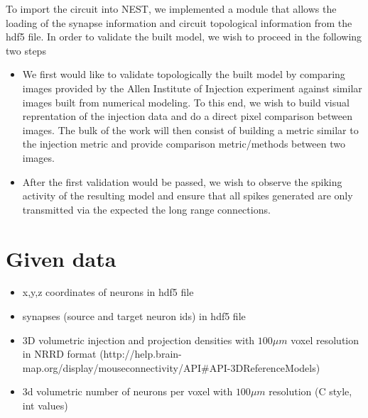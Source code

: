 \documentclass[a4paper]{IEEEtran}
\begin{document}
   
   To import the circuit into NEST, we implemented a module that allows the loading of the synapse information and circuit topological information from the hdf5 file.
   In order to validate the built model, we wish to proceed in the following two steps
\begin{itemize} 
\item We first would like to validate topologically the built model by comparing images provided by the Allen Institute of Injection experiment against 
similar images built from numerical modeling. To this end, we wish to build visual reprentation of the injection data and do a direct pixel comparison between images. The bulk of the work will then consist of building a metric similar to the injection metric and provide comparison metric/methods between two images.
\item After the first validation would be passed, we wish to observe the spiking activity of the resulting model and ensure that all spikes generated are only transmitted via the expected the long range connections. 
\end{itemize}
   
   \section{Given data}
   \begin{itemize}
      \item x,y,z coordinates of neurons in hdf5 file
      \item synapses (source and target neuron ids) in hdf5 file
	  \item 3D volumetric injection and projection densities with $100\mu m$ voxel resolution in NRRD format
	  (http://help.brain-map.org/display/mouseconnectivity/API\#API-3DReferenceModels)
	  \item 3d volumetric number of neurons per voxel with $100\mu m$ resolution (C style, int values)
   \end{itemize}
   
   \begin{figure}[ht!]
   	\begin{center}
        \hspace{0.1cm}
    	   \end{center}
   \label{fig:atlas}
   \end{figure}
   
\end{document}
